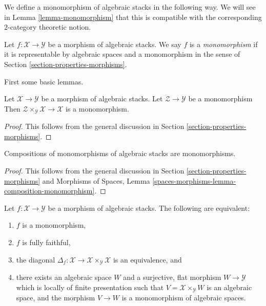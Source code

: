 \noindent
We define a monomorphism of algebraic stacks in the following way.
We will see in
Lemma \ref{lemma-monomorphism}
that this is compatible with the corresponding $2$-category theoretic notion.

\begin{definition}
\label{definition-monomorphism}
Let $f : \mathcal{X} \to \mathcal{Y}$ be a morphism of algebraic stacks.
We say $f$ is a {\it monomorphism}
if it is representable by algebraic spaces and a monomorphism in the sense of
Section \ref{section-properties-morphisms}.
\end{definition}

\noindent
First some basic lemmas.

\begin{lemma}
\label{lemma-base-change-monomorphism}
Let $\mathcal{X} \to \mathcal{Y}$ be a morphism of algebraic stacks.
Let $\mathcal{Z} \to \mathcal{Y}$ be a monomorphism
Then $\mathcal{Z} \times_{\mathcal{Y}} \mathcal{X} \to \mathcal{X}$
is a monomorphism.
\end{lemma}

\begin{proof}
This follows from the general discussion in
Section \ref{section-properties-morphisms}.
\end{proof}

\begin{lemma}
\label{lemma-composition-monomorphism}
Compositions of monomorphisms of algebraic stacks are monomorphisms.
\end{lemma}

\begin{proof}
This follows from the general discussion in
Section \ref{section-properties-morphisms}
and
Morphisms of Spaces,
Lemma \ref{spaces-morphisms-lemma-composition-monomorphism}.
\end{proof}

\begin{lemma}
\label{lemma-monomorphism}
Let $f : \mathcal{X} \to \mathcal{Y}$ be a morphism of algebraic stacks.
The following are equivalent:
\begin{enumerate}
\item $f$ is a monomorphism,
\item $f$ is fully faithful,
\item the diagonal
$\Delta_f : \mathcal{X} \to \mathcal{X} \times_{\mathcal{Y}} \mathcal{X}$
is an equivalence, and
\item there exists an algebraic space $W$ and a surjective, flat morphism
$W \to \mathcal{Y}$ which is locally of finite presentation such that
$V = \mathcal{X} \times_{\mathcal{Y}} W$ is an algebraic space, and the
morphism $V \to W$ is a monomorphism of algebraic spaces.
\end{enumerate}
\end{lemma}

